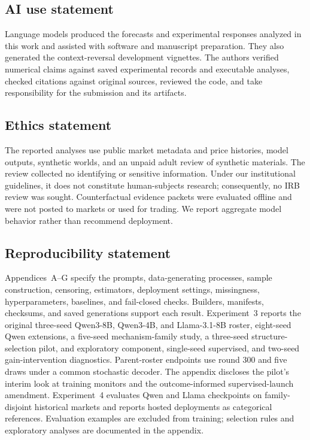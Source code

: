 \subsection*{AI use statement}

Language models produced the forecasts and experimental responses analyzed in this
work and assisted with software and manuscript preparation. They also generated
the context-reversal development vignettes. The authors verified
numerical claims against saved experimental records and executable analyses, checked
citations against original sources, reviewed the code, and take responsibility for
the submission and its artifacts.

\subsection*{Ethics statement}

The reported analyses use public market metadata and price histories, model
outputs, synthetic worlds, and an unpaid adult review of synthetic materials. The
review collected no identifying or sensitive information. Under our institutional
guidelines, it does not constitute human-subjects research; consequently, no IRB
review was sought. Counterfactual evidence packets were evaluated offline and were
not posted to markets or used for trading. We report aggregate model behavior
rather than recommend deployment.

\subsection*{Reproducibility statement}
Appendices~A--G specify the prompts, data-generating processes, sample construction,
censoring, estimators, deployment settings, missingness, hyperparameters, baselines,
and fail-closed checks. Builders, manifests, checksums, and saved generations support
each result. Experiment~3 reports the original three-seed Qwen3-8B, Qwen3-4B,
and Llama-3.1-8B roster, eight-seed Qwen extensions, a five-seed mechanism-family
study, a three-seed structure-selection pilot, and exploratory component,
single-seed supervised, and two-seed gain-intervention diagnostics. Parent-roster endpoints use
round 300 and five draws under a common stochastic decoder. The appendix
discloses the pilot's interim look at training monitors and the outcome-informed
supervised-launch amendment.
Experiment~4 evaluates Qwen and Llama checkpoints on family-disjoint historical
markets and reports hosted deployments as categorical references. Evaluation
examples are excluded from training; selection rules and exploratory analyses
are documented in the appendix.
